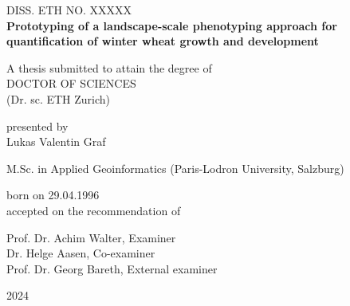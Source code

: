 \begin{titlepage}
    \begin{center}
        DISS. ETH NO. XXXXX\\
        \vspace{0.9cm}    
        \Huge
        \textbf{Prototyping of a landscape-scale phenotyping approach for quantification of winter wheat growth and development}
            
        \vspace{1.9cm}
        \normalsize
        A thesis submitted to attain the degree of
        \\
        \vspace{0.4cm}
        \large
        DOCTOR OF SCIENCES
        \\
        (Dr. sc. ETH Zurich)
            
        \vspace{1cm}
        presented by\\
        \vspace{0.4cm}
        \Large
        Lukas Valentin Graf
        \vspace{0.4cm}

        \normalsize
        M.Sc. in Applied Geoinformatics (Paris-Lodron University, Salzburg)\\

        \vspace{0.2cm}

        born on 29.04.1996\\
        \vspace{1.4cm}
        \normalsize
        accepted on the recommendation of\\
        \vspace{0.4cm}
        
        Prof. Dr. Achim Walter, Examiner\\
        Dr. Helge Aasen, Co-examiner\\
        Prof. Dr. Georg Bareth, External examiner\\
        \vfill

        \Large
        2024
      
     
    \end{center}
\end{titlepage}